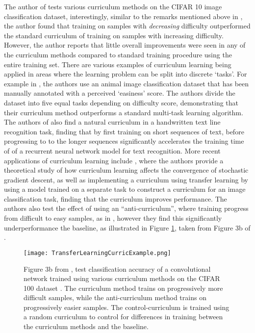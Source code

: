 The author of \cite{avramova2015curriculum} tests various curriculum methods on the CIFAR 10 image classification dataset, interestingly, similar to the remarks mentioned above in \cite{ELMAN199371}, the author found that training on samples with \textit{decreasing} difficulty outperformed the standard curriculum of training on samples with increasing difficulty. However, the author reports that little overall improvements were seen in any of the curriculum methods compared to standard training procedure using the entire training set. There are various examples of curriculum learning being applied in areas where the learning problem can be split into discrete `tasks'. For example in \cite{pentina2015curriculum}, the authors use an animal image classification dataset that has been manually annotated with a perceived `easiness' score. The authors divide the dataset into five equal tasks depending on difficulty score, demonstrating that their curriculum method outperforms a standard multi-task learning algorithm. The authors of \cite{louradour2014curriculum} also find a natural curriculum in a handwritten text line recognition task, finding that by first training on short sequences of text, before progressing to to the longer sequences significantly accelerates the training time of of a recurrent neural network \cite{mikolov2010recurrent} model for text recognition. More recent applications of curriculum learning include \cite{weinshall2018curriculum}, where the authors provide a theoretical study of how curriculum learning affects the convergence of stochastic gradient descent, as well as implementing a curriculum using transfer learning by using a model trained on a separate task to construct a curriculum for an image classification task, finding that the curriculum improves performance. The authors also test the effect of using an ``anti-curriculum'', where training progress from difficult to easy samples, as in \cite{avramova2015curriculum}, however they find this significantly underperformance the baseline, as illustrated in Figure \ref{TransferExample}, taken from Figure 3b of \cite{weinshall2018curriculum}. 

\begin{figure}[h!]
\centering
\texttt{[image: TransferLearningCurricExample.png]}
\caption{Figure 3b from  \cite{weinshall2018curriculum}, test classification accuracy of a convolutional network trained using various curriculum methods on the CIFAR 100 dataset \cite{krizhevsky2009learning}. The curriculum method trains on progressively more difficult samples, while the anti-curriculum method trains on progressively easier samples. The control-curriculum is trained using a random curriculum to control for differences in training between the curriculum methods and the baseline.}
\label{TransferExample}
\end{figure}

